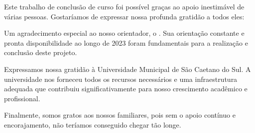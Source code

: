 \begin{agradecimentos}

Este trabalho de conclusão de curso foi possível graças ao apoio inestimável de várias pessoas. Gostaríamos de expressar nossa profunda gratidão a todos eles:

Um agradecimento especial ao nosso orientador, o \imprimirorientador. Sua orientação constante e pronta disponibilidade ao longo de 2023 foram fundamentais para a realização e conclusão deste projeto.

Expressamos nossa gratidão à Universidade Municipal de São Caetano do Sul. A universidade nos forneceu todos os recursos necessários e uma infraestrutura adequada que contribuiu significativamente para nosso crescimento acadêmico e profissional.

Finalmente, somos gratos aos nossos familiares, pois sem o apoio contínuo e encorajamento, não teríamos conseguido chegar tão longe.

\end{agradecimentos}
